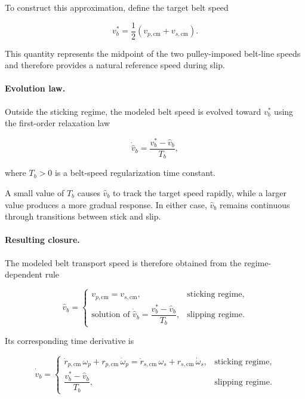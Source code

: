 \documentclass[11pt]{article}
\numberwithin{equation}{section}
\begin{document}
To construct this approximation, define the target belt speed

\begin{equation}
v_b^\ast
=
\frac{1}{2}
\left(
v_{p,\mathrm{cm}} + v_{s,\mathrm{cm}}
\right).
\label{eq:vb_target}
\end{equation}

This quantity represents the midpoint of the two pulley-imposed belt-line
speeds and therefore provides a natural reference speed during slip.

\paragraph{Evolution law.}

Outside the sticking regime, the modeled belt speed is evolved toward
\(v_b^\ast\) using the first-order relaxation law

\begin{equation}
\dot{\hat{v}}_b
=
\frac{v_b^\ast - \hat{v}_b}{T_b},
\label{eq:vb_relaxation}
\end{equation}

where \(T_b > 0\) is a belt-speed regularization time constant.

A small value of \(T_b\) causes \(\hat{v}_b\) to track the target speed
rapidly, while a larger value produces a more gradual response.
In either case, \(\hat{v}_b\) remains continuous through transitions between
stick and slip.

\paragraph{Resulting closure.}

The modeled belt transport speed is therefore obtained from the regime-dependent
rule

\begin{equation}
\hat{v}_b =
\begin{cases}
v_{p,\mathrm{cm}} = v_{s,\mathrm{cm}},
&
\text{sticking regime},
\\[10pt]
\text{solution of }
\dot{\hat{v}}_b = \dfrac{v_b^\ast - \hat{v}_b}{T_b},
&
\text{slipping regime.}
\end{cases}
\label{eq:vb_regime_law}
\end{equation}

Its corresponding time derivative is

\begin{equation}
\dot{\hat{v}}_b =
\begin{cases}
\dot r_{p,\mathrm{cm}}\,\omega_p + r_{p,\mathrm{cm}}\,\dot\omega_p
=
\dot r_{s,\mathrm{cm}}\,\omega_s + r_{s,\mathrm{cm}}\,\dot\omega_s,
&
\text{sticking regime},
\\[10pt]
\dfrac{v_b^\ast - \hat{v}_b}{T_b},
&
\text{slipping regime.}
\end{cases}
\label{eq:vb_dot_regime_law}
\end{equation}
\end{document}
